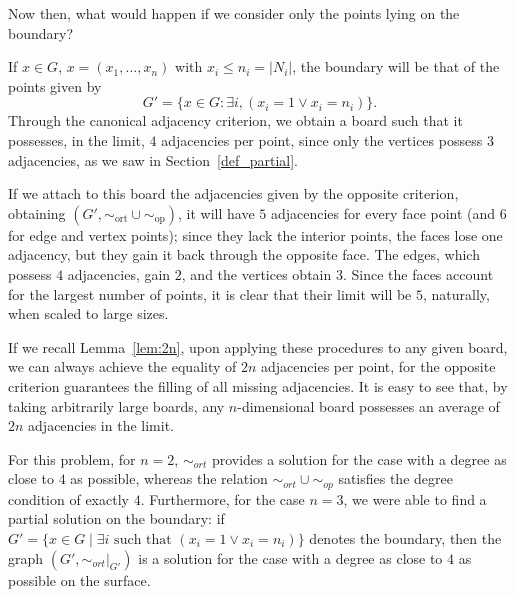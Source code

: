 Now then, what would happen if we consider only the points lying on the boundary?

If \(x\in G\), \(x=(x_1,\dots,x_n)\) with \(x_i \leq n_i = |N_i|\), the boundary will be that of the points given by
$$G'=\{x\in G: \exists i, (x_i= 1 \lor x_i =n_i) \}.$$ Through the canonical adjacency criterion, we obtain a board such that it possesses, in the limit, $4$ adjacencies per point, since only the vertices possess $3$ adjacencies, as we saw in Section~\ref{def_partial}.

If we attach to this board the adjacencies given by the opposite criterion, obtaining \((G',\sim_{\text{ort}} \cup \sim_{\text{op}})\), it will have $5$ adjacencies for every face point (and $6$ for edge and vertex points); since they lack the interior points, the faces lose one adjacency, but they gain it back through the opposite face. The edges, which possess $4$ adjacencies, gain $2$, and the vertices obtain $3$. Since the faces account for the largest number of points, it is clear that their limit will be $5$, naturally, when scaled to large sizes.

If we recall Lemma~\ref{lem:2n}, upon applying these procedures to any given board, we can always achieve the equality of $2n$ adjacencies per point, for the opposite criterion guarantees the filling of all missing adjacencies. It is easy to see that, by taking arbitrarily large boards, any \(n\)-dimensional board possesses an average of $2n$ adjacencies in the limit.

For this problem, for \(n=2\), \(\sim_{ort}\) provides a solution for the case with a degree as close to $4$ as possible, whereas the relation \( \sim_{ort} \cup \sim_{{op}}\) satisfies the degree condition of exactly $4$. Furthermore, for the case \(n = 3\), we were able to find a partial solution on the boundary: if \(G' = \{ x \in G \mid \exists i \text{ such that } (x_i = 1 \lor x_i = n_i) \}\) denotes the boundary, then the graph \((G', \sim_{ort}|_{G'})\) is a solution for the case with a degree as close to $4$ as possible on the surface.

